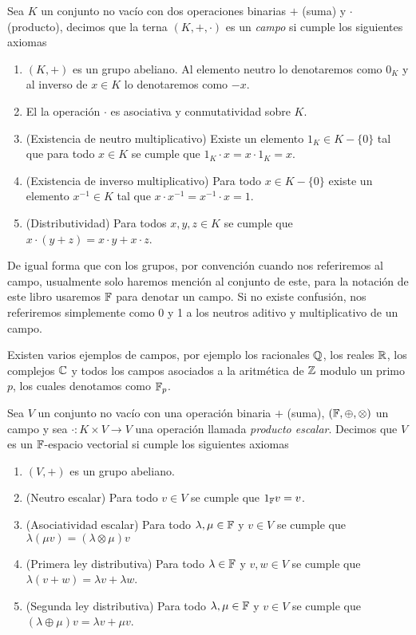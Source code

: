 \begin{defi}
  Sea $K$ un conjunto no vacío con dos operaciones binarias $+$ (suma) y $\cdot$ (producto), decimos que la terna $(K, +, \cdot)$ es un \emph{campo} si cumple los siguientes axiomas
  \begin{enumerate}
    \item $(K,+)$ es un grupo abeliano. Al elemento neutro lo denotaremos como $0_K$ y al inverso de $x \in K$ lo denotaremos como $-x$.
    \item El la operación $\cdot$ es asociativa y conmutatividad sobre $K$.
    \item (Existencia de neutro multiplicativo) Existe un elemento $1_K \in K-\{0\}$ tal que para todo $x \in K$ se cumple que $1_K\cdot x = x\cdot 1_K = x$.
    \item (Existencia de inverso multiplicativo) Para todo $x \in K-\{0\}$ existe un elemento $ x^{-1} \in K$ tal que $x \cdot x^{-1} = x^{-1} \cdot x = 1$.
    \item (Distributividad) Para todos $x, y, z \in K$ se cumple que $x \cdot (y + z) = x \cdot y + x \cdot z$.
  \end{enumerate}
\end{defi}

De igual forma que con los grupos, por convención cuando nos referiremos al campo, usualmente solo haremos mención al conjunto de este, para la notación de este libro usaremos $\mathbb{F}$ para denotar un campo. Si no existe confusión, nos referiremos simplemente como 0 y 1 a los neutros aditivo y multiplicativo de un campo.

Existen varios ejemplos de campos, por ejemplo los racionales $\mathbb{Q}$, los reales $\mathbb{R}$, los complejos $\mathbb{C}$ y todos los campos asociados a la aritmética de $\mathbb{Z}$ modulo un primo $p$, los cuales denotamos como $\mathbb{F}_p$.

\begin{defi}
  Sea $V$ un conjunto no vacío con una operación binaria $+$ (suma), $(\mathbb{F}, \oplus, \otimes)$ un campo y sea $\cdot\colon K \times V \to V$ una operación llamada \emph{producto escalar}. Decimos que $V$ es un $\mathbb{F}$-espacio vectorial si cumple los siguientes axiomas
  \begin{enumerate}
    \item $(V, +)$ es un grupo abeliano.
    \item (Neutro escalar) Para todo $v \in V$ se cumple que $1_{\mathbb{F}} v = v$.
    \item (Asociatividad escalar) Para todo $\lambda, \mu \in \mathbb{F}$ y $v \in V$ se cumple que $\lambda (\mu v) = (\lambda \otimes \mu) v$
    \item (Primera ley distributiva) Para todo $\lambda \in \mathbb{F}$ y $v,w \in V$ se cumple que $\lambda(v + w) = \lambda v + \lambda w$.
    \item (Segunda ley distributiva) Para todo $\lambda, \mu \in \mathbb{F}$ y $v\in V$ se cumple que $(\lambda\oplus\mu)v = \lambda v + \mu v$.
  \end{enumerate}
\end{defi}

